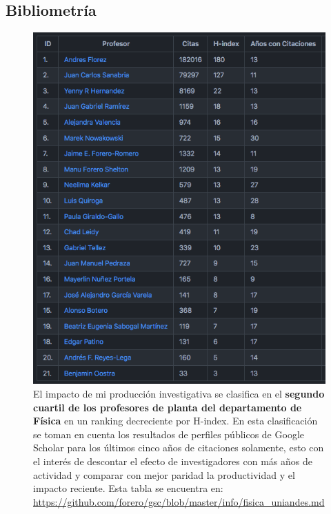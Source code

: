 \documentclass{article}
\begin{document}
\subsection{Bibliometr\'ia}
\begin{figure}[!h]
\begin{center}
\includegraphics[scale=0.55]{scholar_fisica.png}
\caption{
El impacto de mi producci\'on investigativa se clasifica en el {\bf segundo cuartil de los profesores de planta del departamento de F\'isica} en
  un ranking decreciente por H-index. 
  En esta clasificaci\'on se toman en cuenta los resultados de
  perfiles p\'ublicos de Google Scholar
  para los \'ultimos cinco a\~nos de citaciones solamente, esto con el
  inter\'es de descontar el efecto de investigadores con m\'as a\~nos de
  actividad y comparar con mejor paridad la productividad
 y el impacto  reciente. Esta tabla se encuentra en: \url{https://github.com/forero/gsc/blob/master/info/fisica_uniandes.md}\label{table:fisica}}
\end{center}
\end{figure}

\newpage
\end{document}
